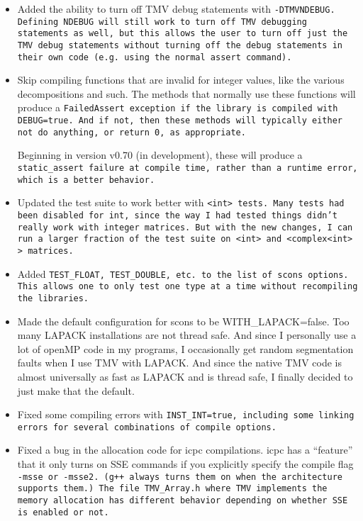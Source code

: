 \begin{itemize}
\item Added the ability to turn off TMV debug statements with \tt{-DTMVNDEBUG}.
Defining \tt{NDEBUG} will still work to turn off TMV debugging statements as well, but this
allows the user to turn off just the TMV debug statements without turning off the debug
statements in their own code (e.g. using the normal \tt{assert} command).

\item Skip compiling functions that are invalid for integer values, like the various decompositions 
and such.  The methods that normally use these functions will produce a \tt{FailedAssert}
exception if the library is compiled with \tt{DEBUG=true}.  And if not, then these methods 
will typically either not do anything, or return 0, as appropriate.  

Beginning in version v0.70 (in development), these will produce a \tt{static\_assert} failure
at compile time, rather than a runtime error, which is a better behavior.

\item Updated the test suite to work better with \tt{<int>} tests.  Many tests had been disabled
for \tt{int}, since the way I had tested things didn't really work with integer matrices.
But with the new changes, I can run a larger fraction of the test suite on \tt{<int>} and
\tt{<complex<int> >} matrices.

\item Added \tt{TEST\_FLOAT}, \tt{TEST\_DOUBLE}, etc. to the list of scons options.  
  This allows one to only test one type at a time without recompiling the libraries.

\item Made the default configuration for scons to be WITH\_LAPACK=false.
   Too many LAPACK installations are not thread safe.  And since I 
   personally use a lot of openMP code in my programs, I occasionally
   get random segmentation faults when I use TMV with LAPACK.  
   And since the native TMV code is almost universally as fast as LAPACK
   and is thread safe, I finally decided to just make that the default.

\item Fixed some compiling errors with \tt{INST_INT=true}, including some linking errors 
for several combinations of compile options.

\item Fixed a bug in the allocation code for icpc compilations.
   icpc has a ``feature'' that it only turns on SSE commands if you explicitly
   specify the compile flag \tt{-msse} or \tt{-msse2}.  (g++ always turns them on
   when the architecture supports them.)  The file \tt{TMV\_Array.h} where TMV implements
   the memory allocation has different
   behavior depending on whether SSE is enabled or not.


\end{itemize}
